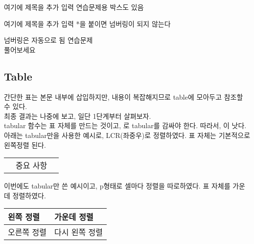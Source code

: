 \begin{practicebox}{여기에 제목을 추가 입력}
연습문제용 박스도 있음
\end{practicebox}

\begin{practicebox*}{여기에 제목을 추가 입력}
*을 붙이면 넘버링이 되지 않는다
\end{practicebox*}

\begin{practicebox}{넘버링은 자동으로 됨}
연습문제\\
풀어보세요
\end{practicebox}

\subsection{Table}
%
간단한 표는 본문 내부에 삽입하지만, 내용이 복잡해지므로 table에 모아두고 참조할 수 있다. \\
최종 결과는 나중에 보고, 일단 1단계부터 살펴보자. \\

tabular 함수는 표 자체를 만드는 것이고,
로 tabular를 감싸야 한다.
따라서, 이 낫다.
아래는 tabular만을 사용한 예시로, LCR(좌중우)로 정렬하였다.
표 자체는 기본적으로 왼쪽정렬 된다. \\
\vspace{-1em}%
\begin{tabular}{|L{3cm}|C{3cm}|R{2cm}|} %
\hline
{} &  &  \\
\hline
{} & 중요 사항 & \\
\hline
\end{tabular}%

\vspace{10pt}%
이번에도 tabular만 쓴 예시이고, p형태로 셀마다 정렬을 따로하였다.
표 자체를 가운데 정렬하였다. \\
\vspace{-2.1em}%
\begin{center}
\begin{tabular}{|p{4cm}|p{4cm}|}
\hline
\raggedright 왼쪽 정렬 & \centering 가운데 정렬 \tabularnewline
\hline
\raggedleft 오른쪽 정렬 & \raggedright 다시 왼쪽 정렬 \tabularnewline
\hline
\end{tabular}
\end{center}%

